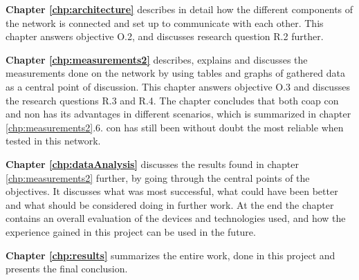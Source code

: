 \noindent \textbf{Chapter \ref{chp:architecture}} describes in detail how the different components of the network is connected and set up to communicate with each other. This chapter answers objective O.2, and discusses research question R.2 further. 

\noindent \textbf{Chapter \ref{chp:measurements2}} describes, explains and discusses the measurements done on the network by using tables and graphs of gathered data as a central point of discussion. This chapter answers objective O.3 and discusses the research questions R.3 and R.4. The chapter concludes that both \gls{coap} \gls{con} and \gls{non} has its advantages in different scenarios, which is summarized in chapter \ref{chp:measurements2}.6. \gls{con} has still been without doubt the most reliable when tested in this network. 

\noindent \textbf{Chapter \ref{chp:dataAnalysis}} discusses the results found in chapter \ref{chp:measurements2} further, by going through the central points of the objectives. It discusses what was most successful, what could have been better and what should be considered doing in further work. At the end the chapter contains an overall evaluation of the devices and technologies used, and how the experience gained in this project can be used in the future. 

\noindent \textbf{Chapter \ref{chp:results}} summarizes the entire work, done in this project and presents the final conclusion.  





